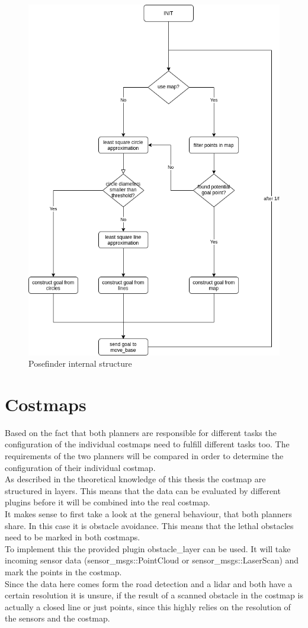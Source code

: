 \begin{figure}[H]
	\centering
	\includegraphics[width=.5\textwidth]{Pictures/posefinder diagram}
	\caption{Posefinder internal structure}
	\label{posefinder structure}
\end{figure}


\section{Costmaps}
Based on the fact that both planners are responsible for different tasks the configuration of the individual costmaps need to fulfill different tasks too. The requirements of the two planners will be compared in order to determine the configuration of their individual costmap.\\

As described in the theoretical knowledge of this thesis the costmap are structured in layers. This means that the data can be evaluated by different plugins before it will be combined into the real costmap.\\

It makes sense to first take a look at the general behaviour, that both planners share. In this case it is obstacle avoidance. This means that the lethal obstacles need to be marked in both costmaps.\\

To implement this the provided plugin obstacle\_layer can be used. It will take incoming sensor data (sensor\_msgs::PointCloud or sensor\_msgs::LaserScan) and mark the points in the costmap.\\

Since the data here comes form the road detection and a lidar and both have a certain resolution it is unsure, if the result of a scanned obstacle in the costmap is actually a closed line or just points, since this highly relies on the resolution of the sensors and the costmap.\\

